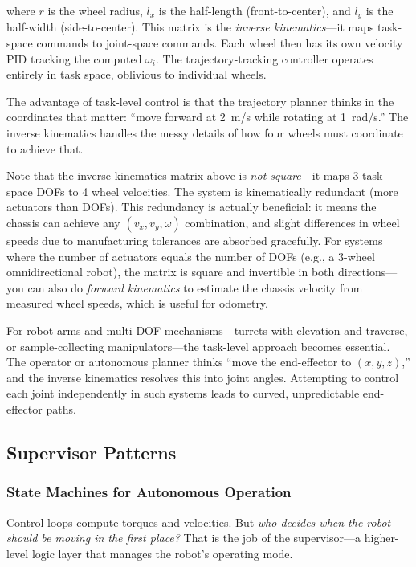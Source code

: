 where $r$ is the wheel radius, $l_x$ is the half-length (front-to-center), and $l_y$ is the half-width (side-to-center). This matrix is the \textit{inverse kinematics}---it maps task-space commands to joint-space commands. Each wheel then has its own velocity PID tracking the computed $\omega_i$. The trajectory-tracking controller operates entirely in task space, oblivious to individual wheels.

The advantage of task-level control is that the trajectory planner thinks in the coordinates that matter: ``move forward at 2~m/s while rotating at 1~rad/s.'' The inverse kinematics handles the messy details of how four wheels must coordinate to achieve that.

Note that the inverse kinematics matrix above is \textit{not square}---it maps 3 task-space DOFs to 4 wheel velocities. The system is kinematically redundant (more actuators than DOFs). This redundancy is actually beneficial: it means the chassis can achieve any $(v_x, v_y, \omega)$ combination, and slight differences in wheel speeds due to manufacturing tolerances are absorbed gracefully. For systems where the number of actuators equals the number of DOFs (e.g., a 3-wheel omnidirectional robot), the matrix is square and invertible in both directions---you can also do \textit{forward kinematics} to estimate the chassis velocity from measured wheel speeds, which is useful for odometry.

For robot arms and multi-DOF mechanisms---turrets with elevation and traverse, or sample-collecting manipulators---the task-level approach becomes essential. The operator or autonomous planner thinks ``move the end-effector to $(x, y, z)$,'' and the inverse kinematics resolves this into joint angles. Attempting to control each joint independently in such systems leads to curved, unpredictable end-effector paths.

\subsection{Supervisor Patterns}

\subsubsection{State Machines for Autonomous Operation}

Control loops compute torques and velocities. But \textit{who decides when the robot should be moving in the first place?} That is the job of the supervisor---a higher-level logic layer that manages the robot's operating mode.

